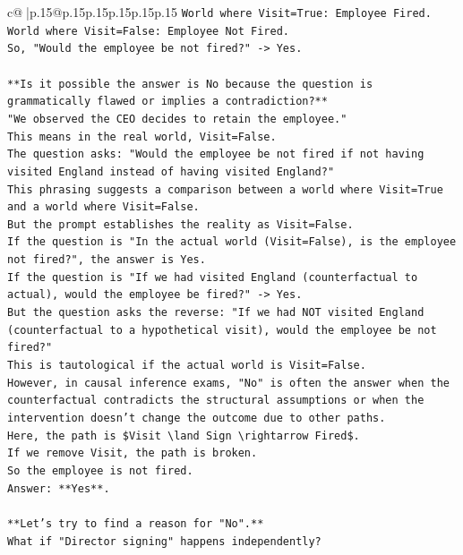 \documentclass{article}
\begin{document}
{\begin{supertabular}{c@{$\;$}|p{.15\linewidth}@{}p{.15\linewidth}p{.15\linewidth}p{.15\linewidth}p{.15\linewidth}p{.15\linewidth}}
{{{\texttt{World where Visit=True: Employee Fired.} \\
\texttt{World where Visit=False: Employee Not Fired.} \\
\texttt{So, "Would the employee be not fired?" {-}> Yes.} \\
\\ 
\texttt{**Is it possible the answer is No because the question is grammatically flawed or implies a contradiction?**} \\
\texttt{"We observed the CEO decides to retain the employee."} \\
\texttt{This means in the real world, Visit=False.} \\
\texttt{The question asks: "Would the employee be not fired if not having visited England instead of having visited England?"} \\
\texttt{This phrasing suggests a comparison between a world where Visit=True and a world where Visit=False.} \\
\texttt{But the prompt establishes the reality as Visit=False.} \\
\texttt{If the question is "In the actual world (Visit=False), is the employee not fired?", the answer is Yes.} \\
\texttt{If the question is "If we had visited England (counterfactual to actual), would the employee be fired?" {-}> Yes.} \\
\texttt{But the question asks the reverse: "If we had NOT visited England (counterfactual to a hypothetical visit), would the employee be not fired?"} \\
\texttt{This is tautological if the actual world is Visit=False.} \\
\texttt{However, in causal inference exams, "No" is often the answer when the counterfactual contradicts the structural assumptions or when the intervention doesn't change the outcome due to other paths.} \\
\texttt{Here, the path is \$Visit \textbackslash{}land Sign \textbackslash{}rightarrow Fired\$.} \\
\texttt{If we remove Visit, the path is broken.} \\
\texttt{So the employee is not fired.} \\
\texttt{Answer: **Yes**.} \\
\\ 
\texttt{**Let's try to find a reason for "No".**} \\
\texttt{What if "Director signing" happens independently?} \\
}}}
\end{supertabular}}
\end{document}
